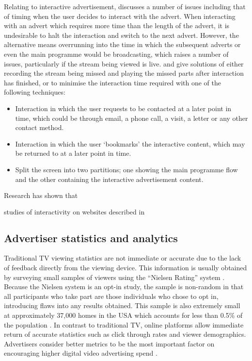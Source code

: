 	Relating to interactive advertisement, \citet{integrated-approach-advertising} discusses a number of issues including that of timing when the user decides to interact with the advert. When interacting with an advert which requires more time than the length of the advert, it is undesirable to halt the interaction and switch to the next advert. However, the alternative means overrunning into the time in which the subsequent adverts or even the main programme would be broadcasting, which raises a number of issues, particularly if the stream being viewed is live. \citet{integrated-approach-advertising} and \citet{personalised_interactive_tv_advertising} give solutions of either recording the stream being missed and playing the missed parts after interaction has finished, or to minimise the interaction time required with one of the following techniques:
	\begin{itemize}
		\item Interaction in which the user requests to be contacted at a later point in time, which could be through email, a phone call, a visit, a letter or any other contact method.
		\item Interaction in which the user `bookmarks' the interactive content, which may be returned to at a later point in time.
		\item Split the screen into two partitions; one showing the main programme flow and the other containing the interactive advertisement content. 
	\end{itemize}


	\citet{informationOverload}

	Research has shown that \citet{humanVariables}
	
	studies of interactivity on websites described in \citet{Teo2003281}

\subsection{Advertiser statistics and analytics}

	Traditional TV viewing statistics are not immediate or accurate due to the lack of feedback directly from the viewing device. This information is usually obtained by surveying small samples of viewers using the ``Nielsen Rating'' system \citep{nielsen-sample}. Because the Nielsen system is an opt-in study, the sample is non-random in that all participants who take part are those individuals who chose to opt in, introducing flaws into any results obtained. This sample is also extremely small at approximately 37,000 homes in the USA which accounts for less than 0.5\% of the population \citep{nielsen-sample}. In contrast to traditional TV, online platforms allow immediate return of accurate statistics such as click through rates and viewer demographics. Advertisers consider better metrics to be the most important factor on encouraging higher digital video advertising spend \citep{brightroll-report}.


